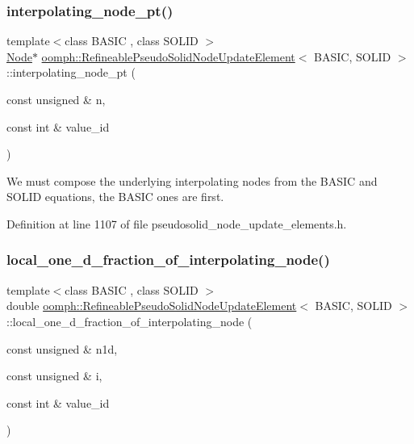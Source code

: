 \subsubsection{\texorpdfstring{interpolating\+\_\+node\+\_\+pt()}{interpolating\_node\_pt()}}
{\footnotesize\ttfamily template$<$class B\+A\+S\+IC , class S\+O\+L\+ID $>$ \\
\hyperlink{classoomph_1_1Node}{Node}$\ast$ \hyperlink{classoomph_1_1RefineablePseudoSolidNodeUpdateElement}{oomph\+::\+Refineable\+Pseudo\+Solid\+Node\+Update\+Element}$<$ B\+A\+S\+IC, S\+O\+L\+ID $>$\+::interpolating\+\_\+node\+\_\+pt (\begin{DoxyParamCaption}\item[{const unsigned \&}]{n,  }\item[{const int \&}]{value\+\_\+id }\end{DoxyParamCaption})\hspace{0.3cm}{\ttfamily [inline]}}



We must compose the underlying interpolating nodes from the B\+A\+S\+IC and S\+O\+L\+ID equations, the B\+A\+S\+IC ones are first. 



Definition at line 1107 of file pseudosolid\+\_\+node\+\_\+update\+\_\+elements.\+h.

\mbox{\label{classoomph_1_1RefineablePseudoSolidNodeUpdateElement_a8e1c7e4695dec50813227ceafa340ada}} 
\subsubsection{\texorpdfstring{local\+\_\+one\+\_\+d\+\_\+fraction\+\_\+of\+\_\+interpolating\+\_\+node()}{local\_one\_d\_fraction\_of\_interpolating\_node()}}
{\footnotesize\ttfamily template$<$class B\+A\+S\+IC , class S\+O\+L\+ID $>$ \\
double \hyperlink{classoomph_1_1RefineablePseudoSolidNodeUpdateElement}{oomph\+::\+Refineable\+Pseudo\+Solid\+Node\+Update\+Element}$<$ B\+A\+S\+IC, S\+O\+L\+ID $>$\+::local\+\_\+one\+\_\+d\+\_\+fraction\+\_\+of\+\_\+interpolating\+\_\+node (\begin{DoxyParamCaption}\item[{const unsigned \&}]{n1d,  }\item[{const unsigned \&}]{i,  }\item[{const int \&}]{value\+\_\+id }\end{DoxyParamCaption})\hspace{0.3cm}{\ttfamily [inline]}}



